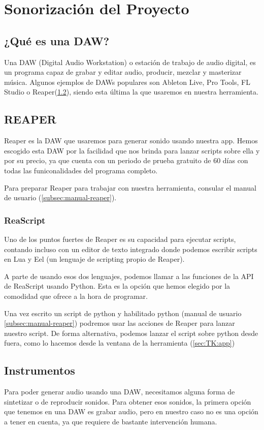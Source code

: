 \chapter{Sonorización del Proyecto}

\section{¿Qué es una DAW?}
Una DAW (Digital Audio Workstation) o estación de trabajo de audio digital, es un programa capaz de grabar y editar audio, producir, mezclar y masterizar música. Algunos ejemplos de DAWs populares son Ableton Live, Pro Tools, FL Studio o Reaper(\ref{sec:reaper}), siendo esta última la que usaremos en nuestra herramienta.

\section{REAPER}\label{sec:reaper}
Reaper es la DAW que usaremos para generar sonido usando nuestra app. Hemos escogido esta DAW por la facilidad que nos brinda para lanzar scripts sobre ella y por su precio, ya que cuenta con un periodo de prueba gratuito de 60 días con todas las funiconalidades del programa completo.

Para preparar Reaper para trabajar con nuestra herramienta, consular el manual de usuario (\ref{subsec:manual-reaper}).

\subsection{ReaScript}\label{subsec:reascripy}

Uno de los puntos fuertes de Reaper es su capacidad para ejecutar scripts, contando incluso con un editor de texto integrado donde podemos escribir scripts en Lua y Eel (un lenguaje de scripting propio de Reaper). 

A parte de usando esos dos lenguajes, podemos llamar a las funciones de la API de ReaScript usando Python. Esta es la opción que hemos elegido por la comodidad que ofrece a la hora de programar.

Una vez escrito un script de python y habilitado python (manual de usuario \ref{subsec:manual-reaper}) podremos usar las acciones de Reaper para lanzar nuestro script. De forma alternativa, podemos lanzar el script sobre python desde fuera, como lo hacemos desde la ventana de la herramienta (\ref{sec:TK:app})

\section{Instrumentos}
Para poder generar audio usando una DAW, necesitamos alguna forma de sintetizar o de reproducir sonidos. Para obtener esos sonidos, la primera opción que tenemos en una DAW es grabar audio, pero en nuestro caso no es una opción a tener en cuenta, ya que requiere de bastante intervención humana. 

